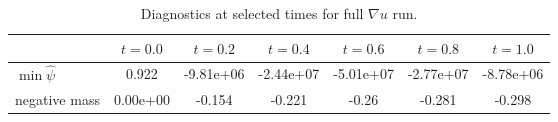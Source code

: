 \begin{table}[htbp]
\centering
\caption{Diagnostics at selected times for full $\nabla u$ run.}
\label{tab:structure_diagnostics}
\begin{tabular}{|l|*{6}{c|}}
\hline
 & $t=0.0$ & $t=0.2$ & $t=0.4$ & $t=0.6$ & $t=0.8$ & $t=1.0$ \\ \hline
$\min \hat\psi$ & 0.922 & -9.81e+06 & -2.44e+07 & -5.01e+07 & -2.77e+07 & -8.78e+06 \\ \hline
negative mass & 0.00e+00 & -0.154 & -0.221 & -0.26 & -0.281 & -0.298 \\ \hline
\end{tabular}
\end{table}